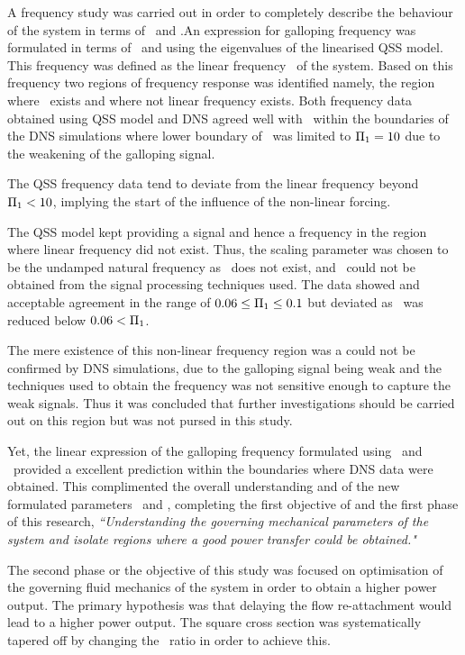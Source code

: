  A frequency study was carried out in order to completely describe the behaviour of the system in terms of \massstiff\ and \massdamp.An expression for galloping frequency was formulated in terms of \massstiff\ and \massdamp using the eigenvalues of the linearised QSS model. This frequency was defined as the linear frequency \freqlin\ of the system. Based on this frequency two regions of frequency response was identified namely, the region where \freqlin\ exists and where not linear frequency exists. Both frequency data obtained using QSS model and DNS agreed well with \freqlin\ within the boundaries of the DNS simulations where lower boundary of \massstiff\ was limited to $\Pi_1=10$ due to the weakening of the galloping signal.
 
 The QSS frequency data tend to deviate from the linear frequency beyond $\Pi_1<10$, implying the start of the influence of the non-linear forcing. 
 
 The QSS model kept providing a signal and hence a frequency in the region where linear frequency did not exist. Thus, the scaling parameter was chosen to be the undamped natural frequency as \freqlin\ does not exist, and \freqdns\ could not be obtained from the signal processing techniques used. The data showed and acceptable agreement  in the range of $0.06\leq\Pi_1\leq0.1$ but deviated as \massstiff\ was reduced below $0.06<\Pi_1$.
 
 The mere existence of this non-linear frequency region was a could not be confirmed by DNS simulations, due to the galloping signal being weak and the techniques used to obtain the  frequency was not sensitive enough to capture the weak signals. Thus it was concluded that further investigations should be carried out on this region but was not pursed in this study.
 
 Yet, the linear expression of the galloping frequency formulated using \massstiff\ and \massdamp\ provided a excellent prediction within the boundaries where DNS data were obtained. This complimented the overall understanding and of the new formulated parameters \massstiff\ and \massdamp, completing the first objective of and the first phase of this research, \emph{``Understanding the governing mechanical parameters of the system and isolate regions where a good power transfer could be obtained."}
 
 The second phase or the objective of this study was focused on optimisation of the governing fluid mechanics of the system in order to obtain a higher power output. The primary hypothesis was that delaying the flow re-attachment would lead to a higher power output. The square cross section was systematically tapered off by changing the \ratio\ ratio in order to achieve this.
 
